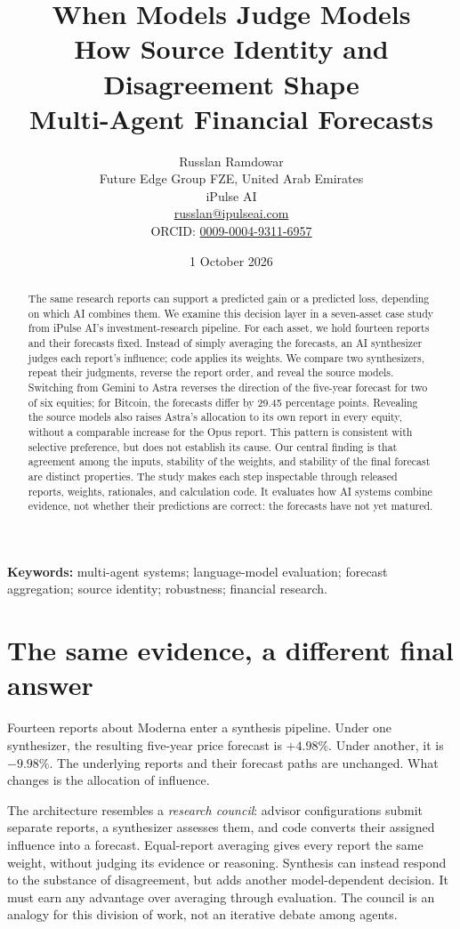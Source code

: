 \documentclass[11pt]{article}
\title{\vspace{-1.2cm}\textbf{When Models Judge Models}\\[5pt]\large How Source Identity and Disagreement Shape\\Multi-Agent Financial Forecasts}
\author{Russlan Ramdowar\\\small Future Edge Group FZE, United Arab Emirates\\\small iPulse AI\\\small\href{mailto:russlan@ipulseai.com}{russlan@ipulseai.com}\\\small ORCID: \href{https://orcid.org/0009-0004-9311-6957}{0009-0004-9311-6957}}
\date{1 October 2026}
\begin{document}
\maketitle
\begin{abstract}
The same research reports can support a predicted gain or a predicted loss, depending on which AI combines them. We examine this decision layer in a seven-asset case study from iPulse AI's investment-research pipeline. For each asset, we hold fourteen reports and their forecasts fixed. Instead of simply averaging the forecasts, an AI synthesizer judges each report's influence; code applies its weights. We compare two synthesizers, repeat their judgments, reverse the report order, and reveal the source models. Switching from Gemini to Astra reverses the direction of the five-year forecast for two of six equities; for Bitcoin, the forecasts differ by 29.45 percentage points. Revealing the source models also raises Astra's allocation to its own report in every equity, without a comparable increase for the Opus report. This pattern is consistent with selective preference, but does not establish its cause. Our central finding is that agreement among the inputs, stability of the weights, and stability of the final forecast are distinct properties. The study makes each step inspectable through released reports, weights, rationales, and calculation code. It evaluates how AI systems combine evidence, not whether their predictions are correct: the forecasts have not yet matured.
\end{abstract}
\textbf{Keywords:} multi-agent systems; language-model evaluation; forecast aggregation; source identity; robustness; financial research.

\section{The same evidence, a different final answer}
Fourteen reports about Moderna enter a synthesis pipeline. Under one synthesizer, the resulting five-year price forecast is $+4.98\%$. Under another, it is $-9.98\%$. The underlying reports and their forecast paths are unchanged. What changes is the allocation of influence.

The architecture resembles a \emph{research council}: advisor configurations submit separate reports, a synthesizer assesses them, and code converts their assigned influence into a forecast. Equal-report averaging gives every report the same weight, without judging its evidence or reasoning. Synthesis can instead respond to the substance of disagreement, but adds another model-dependent decision. It must earn any advantage over averaging through evaluation. The council is an analogy for this division of work, not an iterative debate among agents.
\end{document}

